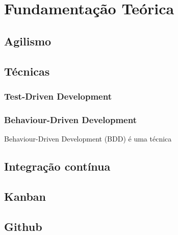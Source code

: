 \chapter{Fundamentação Teórica}

\section{Agilismo}

\section{Técnicas}

\subsection{Test-Driven Development}

\subsection{Behaviour-Driven Development}

Behaviour-Driven Development (BDD) é uma técnica

\section{Integração contínua}

\section{Kanban}

\section{Github}

